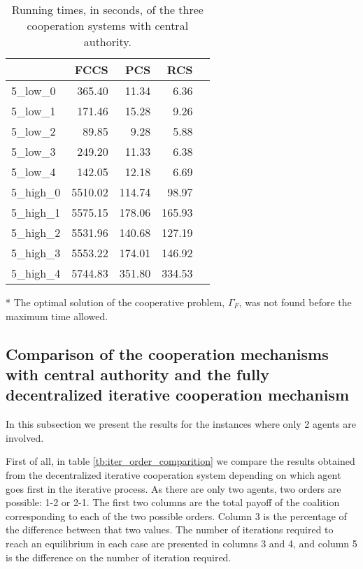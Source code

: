 \documentclass{article}
\begin{document}
\begin{table}[ht!]
\centering
\setlength{\tabcolsep}{12pt}
\caption{Running times, in seconds, of the three cooperation systems with central authority. \label{tb:centralauthoritytimes}}
\begin{threeparttable}
\begin{tabular}{lrrrr}
\toprule
{}  &    FCCS &  PCS &  RCS \\
\midrule
5\_low\_0 &   365.40 &    11.34 &      6.36 \\
5\_low\_1 &     171.46 &    15.28 &      9.26 \\
5\_low\_2 &      89.85 &     9.28 &      5.88 \\
5\_low\_3 &      249.20 &    11.33 &      6.38 \\
5\_low\_4 &      142.05 &    12.18 &      6.69 \\
5\_high\_0 &      5510.02\tnote{*} &   114.74 &     98.97 \\
5\_high\_1 &      5575.15\tnote{*} &   178.06 &    165.93 \\
5\_high\_2 &      5531.96\tnote{*} &   140.68 &    127.19 \\
5\_high\_3 &      5553.22\tnote{*} &   174.01 &    146.92 \\
5\_high\_4 &      5744.83\tnote{*}
 &   351.80 &    334.53 \\
\bottomrule
\end{tabular}
	\begin{tablenotes}\footnotesize
		\item[*] The optimal solution of the cooperative problem, $\Gamma_F$, was not found before the maximum time allowed.
	\end{tablenotes}
\end{threeparttable}
\end{table}

\subsection{Comparison of the cooperation mechanisms with central authority and the fully decentralized iterative cooperation mechanism}
 

In this subsection we present the results for the instances where only 2 agents are involved. 

First of all, in table \ref{tb:iter_order_comparition} we compare the results obtained from the decentralized iterative cooperation system depending on which agent goes first in the iterative process. As there are only two agents, two orders are possible: 1-2 or 2-1. The first two columns are the total payoff of the coalition corresponding to each of the two possible orders. Column 3 is the percentage of the difference between that two values. The number of iterations required to reach an equilibrium in each case are presented in columns 3 and 4, and column 5 is the difference on the number of iteration required.
\end{document}
